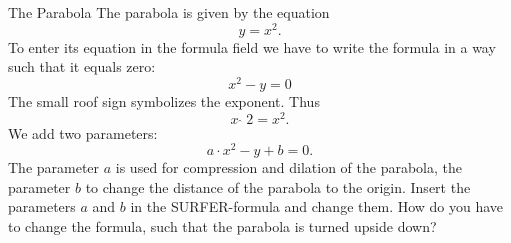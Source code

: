 \begin{surferPage}{The Parabola}
The parabola is given by the equation  \[y=x^2.\]
To enter its equation in the formula field we have to write the formula in a way such that it equals zero:
\[x^2-y=0\]
The small roof sign symbolizes the exponent. Thus 
\[ x  \,\hat{\ } \, 2 =x^2.\]
We add two parameters:
\[a \cdot x^2-y+b=0.\]
The parameter $a$ is used  for compression and dilation of the parabola, the parameter $b$ to change the distance of the parabola to the origin.
\newline
Insert the parameters $a$ and $b$ in the SURFER-formula and change them. How do you have to change the formula, such that the parabola is turned upside down?
\end{surferPage}
